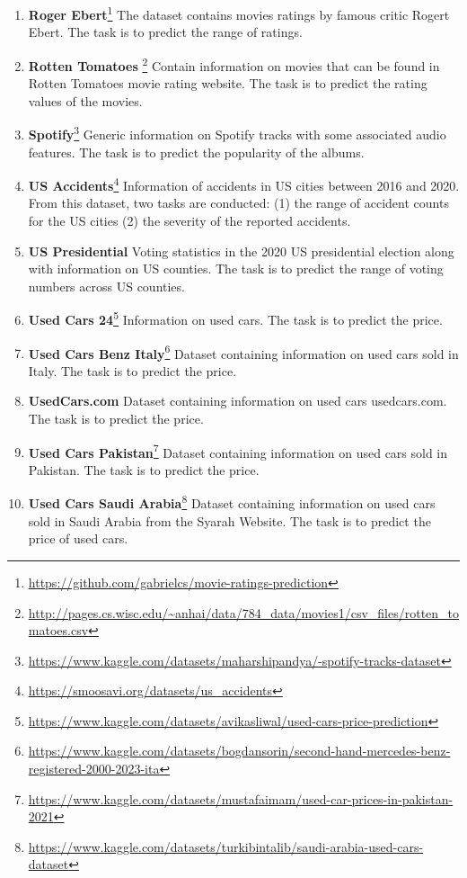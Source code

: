 \documentclass{article}
\theoremstyle{plain}
\theoremstyle{definition}
\theoremstyle{remark}
\begin{document}
\begin{enumerate}
    \item  \textbf{Roger Ebert}\footnote{\url{https://github.com/gabrielcs/movie-ratings-prediction}} The dataset contains movies ratings by famous critic Rogert Ebert. The task is to predict the range of ratings.
    \item  \textbf{Rotten Tomatoes} \citep{magellandata}\footnote{\url{http://pages.cs.wisc.edu/~anhai/data/784_data/movies1/csv_files/rotten_tomatoes.csv}} Contain information on movies that can be found in Rotten Tomatoes movie rating website. The task is to predict the rating values of the movies.
    \item \textbf{Spotify}\footnote{\url{https://www.kaggle.com/datasets/maharshipandya/-spotify-tracks-dataset}} Generic information on Spotify tracks with some associated audio features. The task is to predict the popularity of the albums.
    \item \textbf{US Accidents}\footnote{\url{https://smoosavi.org/datasets/us_accidents}} Information of accidents in US cities between 2016 and 2020. From this dataset, two tasks are conducted: (1) the range of accident counts for the US cities (2) the severity of the reported accidents.
    \item \textbf{US Presidential} \citep{cvetkov2023relational} Voting statistics in the 2020 US presidential election along with information on US counties. The task is to predict the range of voting numbers across US counties.
    \item \textbf{Used Cars 24}\footnote{\url{https://www.kaggle.com/datasets/avikasliwal/used-cars-price-prediction}} Information on used cars. The task is to predict the price.
    \item \textbf{Used Cars Benz Italy}\footnote{\url{https://www.kaggle.com/datasets/bogdansorin/second-hand-mercedes-benz-registered-2000-2023-ita}} Dataset containing information on used cars sold in Italy. The task is to predict the price.
    \item  \textbf{UsedCars.com} Dataset containing information on used cars usedcars.com. The task is to predict the price.
    \item  \textbf{Used Cars Pakistan}\footnote{\url{https://www.kaggle.com/datasets/mustafaimam/used-car-prices-in-pakistan-2021}} Dataset containing information on used cars sold in Pakistan. The task is to predict the price.
    \item  \textbf{Used Cars Saudi Arabia}\footnote{\url{https://www.kaggle.com/datasets/turkibintalib/saudi-arabia-used-cars-dataset}} Dataset containing information on used cars sold in Saudi Arabia from the Syarah Website. The task is to predict the price of used cars.

\end{enumerate}
\end{document}
